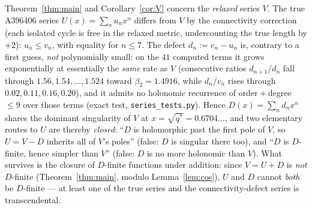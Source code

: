 \begin{remark}\label{rem:UvsV}
Theorem~\ref{thm:main} and Corollary~\ref{cor:V} concern the \emph{relaxed}
series $V$. The true A396406 series $U(x)=\sum_n u_n x^{n}$ differs from $V$ by
the connectivity correction (each isolated cycle is free in the relaxed metric,
undercounting the true length by $+2$): $u_n\le v_n$, with equality for $n\le7$.
The defect $d_n:=v_n-u_n$ is, contrary to a first guess, \emph{not} polynomially
small: on the $41$ computed terms it grows exponentially at essentially the
\emph{same} rate as $V$ (consecutive ratios $d_{n+1}/d_n$ fall through
$1.56,1.54,\ldots,1.524$ toward $\beta_2=1.4916$, while $d_n/v_n$ rises through
$0.02,0.11,0.16,0.20$), and it admits no holonomic recurrence of
order${}+{}$degree $\le 9$ over those terms (exact test, \texttt{series\_tests.py}).
Hence $D(x)=\sum_n d_n x^{n}$ shares the dominant singularity of $V$ at
$x=\sqrt{q^{\ast}}=0.6704\ldots$, and two elementary routes to $U$ are thereby
\emph{closed}: ``$D$ is holomorphic past the first pole of $V$, so $U=V-D$ inherits
all of $V$'s poles'' (false: $D$ is singular there too), and ``$D$ is $D$-finite,
hence simpler than $V$'' (false: $D$ is no more holonomic than $V$). What survives
is the closure of $D$-finite functions under addition: since $V=U+D$ is \emph{not}
$D$-finite (Theorem~\ref{thm:main}, modulo Lemma~\ref{lem:cos}), $U$ and $D$ cannot
\emph{both} be $D$-finite --- at least one of the true series and the
connectivity-defect series is transcendental.


\end{remark}
